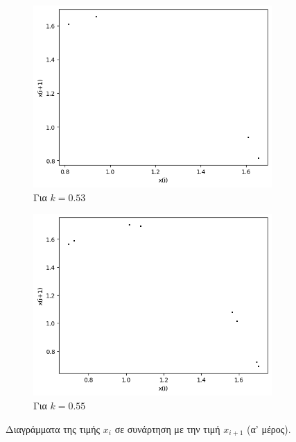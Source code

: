 \begin{figure}[ht]
\begin{subfigure}[b]{0.4\textwidth}
		\includegraphics[width=\textwidth]{LateX images/graphs q05/g5}
		\caption{Για $k=0.53$}
		\label{f:k29}
	\end{subfigure}
	\hfill
	\begin{subfigure}[b]{0.4\textwidth}
		\centering
		\includegraphics[width=\textwidth]{LateX images/graphs q05/g6}
		\caption{Για $k=0.55$}
		\label{f:k30}
	\end{subfigure}
	\hfill
	\caption{Διαγράμματα της τιμής \(x_i\) σε συνάρτηση με την τιμή \(x_{i+1}\) (α' μέρος).}
\end{figure}


